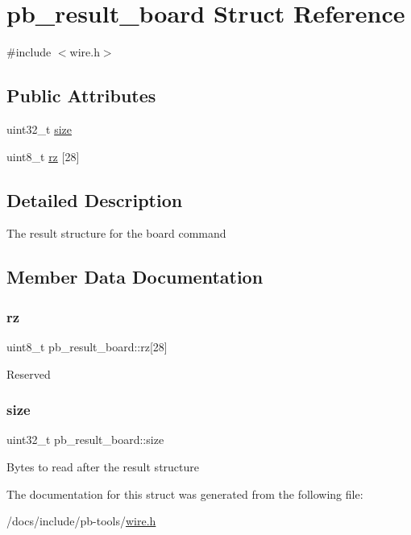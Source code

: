 \hypertarget{structpb__result__board}{}\section{pb\+\_\+result\+\_\+board Struct Reference}
\label{structpb__result__board}


{\ttfamily \#include $<$wire.\+h$>$}

\subsection*{Public Attributes}
\begin{DoxyCompactItemize}
\item 
uint32\+\_\+t \hyperlink{structpb__result__board_a6b0e205d20cf657ed855c17243f83c5f}{size}
\item 
uint8\+\_\+t \hyperlink{structpb__result__board_a06c24c93eca4e76349d338a8a522388e}{rz} \mbox{[}28\mbox{]}
\end{DoxyCompactItemize}


\subsection{Detailed Description}
The result structure for the board command 

\subsection{Member Data Documentation}
\mbox{\label{structpb__result__board_a06c24c93eca4e76349d338a8a522388e}} 
\subsubsection{\texorpdfstring{rz}{rz}}
{\footnotesize\ttfamily uint8\+\_\+t pb\+\_\+result\+\_\+board\+::rz\mbox{[}28\mbox{]}}

Reserved \mbox{\label{structpb__result__board_a6b0e205d20cf657ed855c17243f83c5f}} 
\subsubsection{\texorpdfstring{size}{size}}
{\footnotesize\ttfamily uint32\+\_\+t pb\+\_\+result\+\_\+board\+::size}

Bytes to read after the result structure 

The documentation for this struct was generated from the following file\+:\begin{DoxyCompactItemize}
\item 
/docs/include/pb-\/tools/\hyperlink{wire_8h}{wire.\+h}\end{DoxyCompactItemize}
